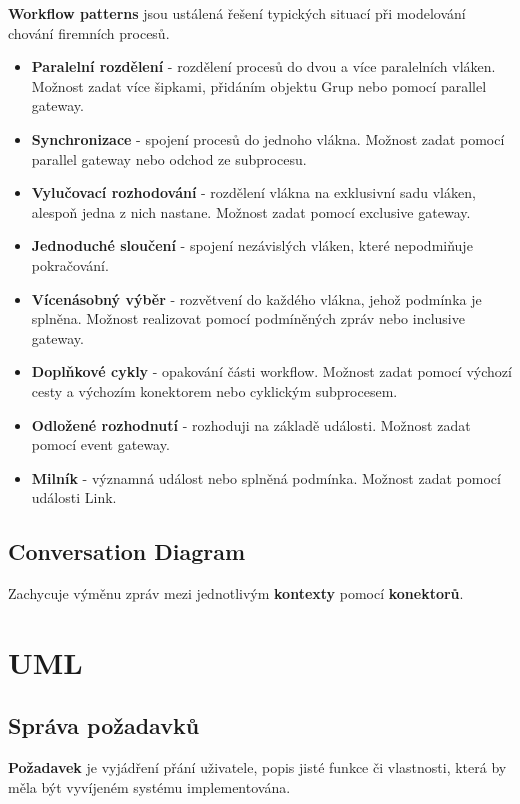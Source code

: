 \textbf{Workflow patterns} jsou ustálená řešení typických situací při modelování chování firemních procesů.

\begin{itemize}
    \item \textbf{Paralelní rozdělení} - rozdělení procesů do dvou a více paralelních vláken. Možnost zadat více šipkami, přidáním objektu Grup nebo pomocí parallel gateway.
    \item \textbf{Synchronizace} - spojení procesů do jednoho vlákna. Možnost zadat pomocí parallel gateway nebo odchod ze subprocesu.
    \item \textbf{Vylučovací rozhodování} - rozdělení vlákna na exklusivní sadu vláken, alespoň jedna z nich nastane. Možnost zadat pomocí exclusive gateway.
    \item \textbf{Jednoduché sloučení} - spojení nezávislých vláken, které nepodmiňuje pokračování.
    \item \textbf{Vícenásobný výběr} - rozvětvení do každého vlákna, jehož podmínka je splněna. Možnost realizovat pomocí podmíněných zpráv nebo inclusive gateway.
    \item \textbf{Doplňkové cykly} - opakování části workflow. Možnost zadat pomocí výchozí cesty a výchozím konektorem nebo cyklickým subprocesem.
    \item \textbf{Odložené rozhodnutí} - rozhoduji na základě události. Možnost zadat pomocí event gateway.
    \item \textbf{Milník} - významná událost nebo splněná podmínka. Možnost zadat pomocí události Link.
\end{itemize}

\subsection{Conversation Diagram}

Zachycuje výměnu zpráv mezi jednotlivým \textbf{kontexty} pomocí \textbf{konektorů}.

\section{UML}
\subsection{Správa požadavků}

\textbf{Požadavek} je vyjádření přání uživatele, popis jisté funkce či vlastnosti, která by měla být vyvíjeném systému implementována.


